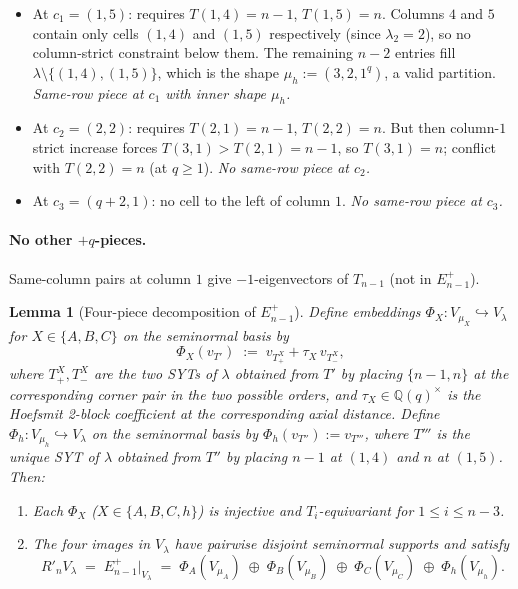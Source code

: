 \documentclass[11pt]{article}
\newtheorem{lemma}[theorem]{Lemma}
\theoremstyle{definition}
\newcommand{\Rp}{{R'}}
\begin{document}
\begin{itemize}[topsep=0.2em,itemsep=0.1em]
\item At $c_1 = (1, 5)$: requires $T(1, 4) = n - 1$, $T(1, 5) = n$.
   Columns $4$ and $5$ contain only cells $(1, 4)$ and $(1, 5)$
   respectively (since $\lambda_2 = 2$), so no column-strict constraint
   below them.  The remaining $n - 2$ entries fill $\lambda \setminus
   \{(1, 4), (1, 5)\}$, which is the shape $\mu_h := (3, 2, 1^q)$, a
   valid partition.  \emph{Same-row piece at $c_1$ with inner shape
   $\mu_h$.}
\item At $c_2 = (2, 2)$: requires $T(2, 1) = n - 1$, $T(2, 2) = n$.
   But then column-$1$ strict increase forces $T(3, 1) > T(2, 1) = n - 1$,
   so $T(3, 1) = n$; conflict with $T(2, 2) = n$ (at $q \ge 1$).
   \emph{No same-row piece at $c_2$.}
\item At $c_3 = (q+2, 1)$: no cell to the left of column $1$.
   \emph{No same-row piece at $c_3$.}
\end{itemize}

\paragraph{No other $+q$-pieces.}  Same-column pairs at column $1$ give
$-1$-eigenvectors of $T_{n-1}$ (not in $E_{n-1}^+$).

\begin{lemma}[Four-piece decomposition of $E_{n-1}^+$]\label{lem:Eplus-decomp}
Define embeddings $\Phi_X : V_{\mu_X} \hookrightarrow V_\lambda$ for
$X \in \{A, B, C\}$ on the seminormal basis by
\[
   \Phi_X(v_{T'}) \;:=\; v_{T^X_+} + \tau_X\,v_{T^X_-},
\]
where $T^X_+, T^X_-$ are the two SYTs of $\lambda$ obtained from $T'$ by
placing $\{n-1, n\}$ at the corresponding corner pair in the two
possible orders, and $\tau_X \in \mathbb{Q}(q)^\times$ is the Hoefsmit
2-block coefficient at the corresponding axial distance.  Define
$\Phi_h : V_{\mu_h} \hookrightarrow V_\lambda$ on the seminormal basis
by $\Phi_h(v_{T''}) := v_{T'''}$, where $T'''$ is the unique SYT of
$\lambda$ obtained from $T''$ by placing $n - 1$ at $(1, 4)$ and $n$ at
$(1, 5)$.  Then:

\begin{enumerate}[topsep=0.3em,itemsep=0.1em,leftmargin=2em,
                  label=(\roman*)]
\item Each $\Phi_X$ ($X \in \{A, B, C, h\}$) is injective and
   $T_i$-equivariant for $1 \le i \le n - 3$.
\item The four images in $V_\lambda$ have pairwise disjoint
   seminormal supports and satisfy
   \[
       \Rp_n V_\lambda \;=\; E_{n-1}^+|_{V_\lambda}
       \;=\; \Phi_A(V_{\mu_A}) \;\oplus\; \Phi_B(V_{\mu_B})
       \;\oplus\; \Phi_C(V_{\mu_C}) \;\oplus\; \Phi_h(V_{\mu_h}).
   \]
\end{enumerate}
\end{lemma}
\end{document}
